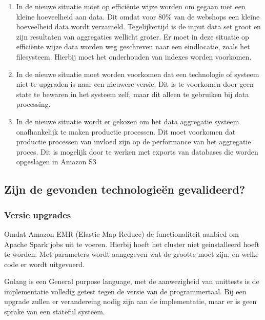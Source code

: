 \begin{enumerate}[label=(\alph*)]
    \item In de nieuwe situatie moet op efficiënte wijze worden om gegaan met een kleine hoeveelheid aan data. Dit omdat voor 80\% van de webshops een kleine hoeveelheid data wordt verzameld. Tegelijkertijd is de input data set groot en zijn resultaten van aggregaties wellicht groter. Er moet in deze situatie op efficiënte wijze data worden weg geschreven naar een eindlocatie,  zoals het filesysteem. Hierbij moet het onderhouden van indexes worden voorkomen.
    
    \item In de nieuwe situatie moet worden voorkomen dat een technologie of systeem niet te upgraden is naar een nieuwere versie. Dit is te voorkomen door geen state te bewaren in het systeem zelf, maar dit alleen te gebruiken bij data processing.
    
    \item In de nieuwe situatie wordt er gekozen om het data aggregatie systeem onafhankelijk te maken productie processen. Dit moet voorkomen dat productie processen van invloed zijn op de performance van het aggregatie proces. Dit is mogelijk door te werken met exports van databases die worden opgeslagen in Amazon S3
\end{enumerate}

\clearpage


\subsection{Zijn de gevonden technologieën gevalideerd?}
\label{subsec:deelvraag3_vergelijking}

\subsubsection{\textbf{Versie upgrades}}

Omdat Amazon  EMR (Elastic Map Reduce) de functionaliteit aanbied om Apache Spark jobs uit te voeren. Hierbij hoeft het cluster niet geinstalleerd hoeft te worden. Met parameters wordt aangegeven wat de grootte moet zijn, en welke code er wordt uitgevoerd. 

Golang is een General purpose language, met de aanwezigheid van unittests is de implementatie volledig getest tegen de versie van de programmertaal. Bij een upgrade zullen er verandereing nodig zijn aan de implementatie, maar er is geen sprake van een stateful systeem.


